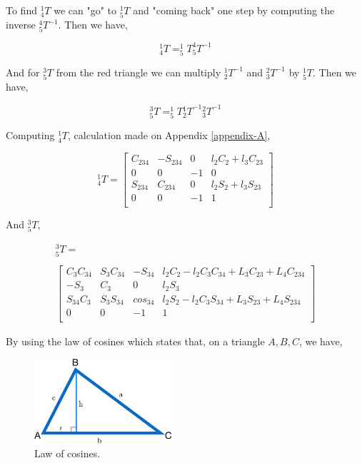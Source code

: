 \documentclass[transmag]{IEEEtran}
\begin{document}
To find $^1_4T$ we can "go" to $^1_5T$ and "coming back" one step by computing the inverse $^4_5T^{-1}$. Then we have,

\begin{equation}
^1_4T = ^1_5T ^4_5T^{-1}
\end{equation}

And for $^3_5T$ from the red triangle we can multiply $^1_2T^{-1}$ and $^2_3T^{-1}$ by $^1_5T$. Then we have,

\begin{equation}
^3_5T = ^1_5T {^1_2T}^{-1}  {^2_3T}^{-1}
\end{equation}


Computing $^1_4T$, calculation made on Appendix \ref{appendix-A},

\begin{equation}
^1_4T = 
\begin{bmatrix}
C_{234} & -S_{234} & 0 & l_2 C_2 + l_3 C_{23} \\
0 & 0 & -1 & 0 \\
S_{234} & C_{234} & 0 & l_2 S_2 + l_3 S_{23} \\
0 & 0 & -1 & 1 \\
\end{bmatrix}
\end{equation}

And $^3_5T$,

\begin{equation}
\begin{matrix}
^3_5T = \\
\\
\begin{bmatrix}
C_{3}C_{34} & S_{3}C_{34} & -S_{34}  & l_2 C_2 - l_2 C_3 C_{34} + L_3 C_{23} + L_4 C_{234} \\
-S_3        & C_3         & 0        & l_2 S_3 \\
S_{34} C_3  & S_3 S_{34}  & cos_{34} & l_2 S_2 - l_2 C_3 S_{34} + L_3 S_{23} + L_4 S_{234}\\
0           & 0           & -1       & 1 \\
\end{bmatrix}
\end{matrix}
\end{equation}






By using the law of cosines which states that, on a triangle $A, B, C$, we have,

\begin{figure}[h]
\centerline{\includegraphics[width=2in]{./images/cosines}}
\caption{Law of cosines.\label{cosines}}
\end{figure}
\end{document}
